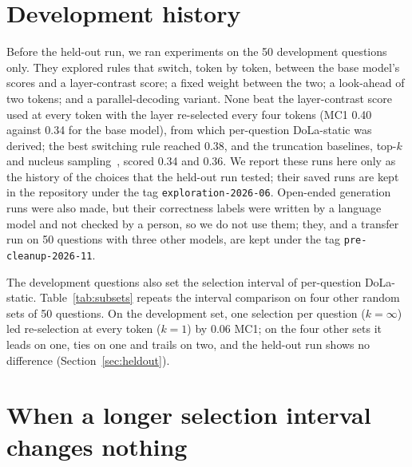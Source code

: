 \documentclass[11pt]{article}
\newcommand{\method}{per-question DoLa-static}
\newcommand{\mainmodel}{Qwen2.5-3B-Instruct}
\begin{document}
\section{Development history}
\label{app:history}

Before the held-out run, we ran experiments on the 50 development questions only. They explored rules that switch,
token by token, between the base model's scores and a layer-contrast score; a fixed weight between the two; a
look-ahead of two tokens; and a parallel-decoding variant. None beat the layer-contrast score used at every token
with the layer re-selected every four tokens (MC1 0.40 against 0.34 for the base model), from which \method{} was
derived; the best switching rule reached 0.38, and the
truncation baselines, top-$k$ and nucleus sampling~\citep{holtzman2020curious}, scored 0.34 and 0.36. We report
these runs here only as the history of the choices that the held-out run tested; their saved runs are kept in the
repository under the tag \texttt{exploration-2026-06}. Open-ended generation runs were
also made, but their correctness labels were written by a language model and not checked by a person, so we do not
use them; they, and a transfer run on 50 questions with three other models, are kept under the tag
\texttt{pre-cleanup-2026-11}.

The development questions also set the selection interval of \method{}. Table~\ref{tab:subsets} repeats the
interval comparison on four other random sets of 50 questions. On the development set, one selection per question
($k = \infty$) led re-selection at every token ($k = 1$) by 0.06 MC1; on the four other sets it leads on one, ties
on one and trails on two, and the held-out run shows no difference (Section~\ref{sec:heldout}).

\begin{table}[h]
\centering\small\setlength{\tabcolsep}{5pt}
\caption{MC1 of \method{} with the premature layer re-selected every $k$ tokens, on the development set and on
four other random sets of 50 questions (\mainmodel{}). With 50 questions one MC1 has a 95\,\% interval of about
$\pm 0.13$.}
\label{tab:subsets}
\end{table}

\section{When a longer selection interval changes nothing}
\label{app:stability}
\end{document}
